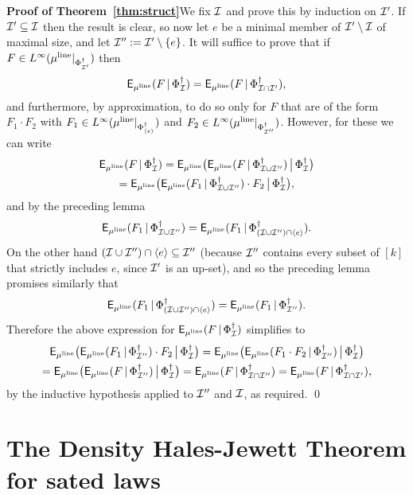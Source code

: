 \documentclass[11pt]{article}
\begin{document}
\textbf{Proof of Theorem~\ref{thm:struct}}\quad We fix $\mathcal{I}$ and
prove this by induction on $\mathcal{I}'$. If $\mathcal{I}' \subseteq \mathcal{I}$ then the
result is clear, so now let $e$ be a minimal member of
$\mathcal{I}'\setminus\mathcal{I}$ of maximal size, and let $\mathcal{I}'' :=
\mathcal{I}'\setminus\{e\}$.  It will suffice to prove that if $F \in
L^\infty(\mu^{\mathrm{line}}|_{\Phi^\dag_{\mathcal{I}'}})$ then
\[\mathsf{E}_{\mu^{\mathrm{line}}}(F\,|\,\Phi^\dag_{\mathcal{I}}) = \mathsf{E}_{\mu^{\mathrm{line}}}(F\,|\,\Phi^\dag_{\mathcal{I}\cap\mathcal{I}'}),\]
and furthermore, by approximation, to do so only for $F$ that are of
the form $F_1\cdot F_2$ with $F_1 \in
L^\infty(\mu^{\mathrm{line}}|_{\Phi^\dag_{\langle e \rangle}})$ and $F_2 \in
L^\infty(\mu^{\mathrm{line}}|_{\Phi^\dag_{\mathcal{I}''}})$. However, for these we can
write \begin{multline*} \mathsf{E}_{\mu^{\mathrm{line}}}(F\,|\,\Phi^\dag_{\mathcal{I}}) =
\mathsf{E}_{\mu^{\mathrm{line}}}\big(\mathsf{E}_{\mu^{\mathrm{line}}}(F\,|\,\Phi^\dag_{\mathcal{I}\cup\mathcal{I}''})\,\big|\,\Phi^\dag_{\mathcal{I}}\big)\\
=
\mathsf{E}_{\mu^{\mathrm{line}}}\big(\mathsf{E}_{\mu^{\mathrm{line}}}(F_1\,|\,\Phi^\dag_{\mathcal{I}\cup\mathcal{I}''})\cdot
F_2\,\big|\,\Phi^\dag_{\mathcal{I}}\big),
\end{multline*}
and by the preceding lemma
\[\mathsf{E}_{\mu^{\mathrm{line}}}(F_1\,|\,\Phi^\dag_{\mathcal{I}\cup\mathcal{I}''})
= \mathsf{E}_{\mu^{\mathrm{line}}}(F_1\,|\,\Phi^\dag_{(\mathcal{I}\cup\mathcal{I}'')\cap\langle
e\rangle}).\] On the other hand $(\mathcal{I}\cup\mathcal{I}'')\cap\langle e\rangle
\subseteq \mathcal{I}''$ (because $\mathcal{I}''$ contains every subset of $[k]$ that
strictly includes $e$, since $\mathcal{I}'$ is an up-set), and so the
preceding lemma promises similarly that
\[\mathsf{E}_{\mu^{\mathrm{line}}}(F_1\,|\,\Phi^\dag_{(\mathcal{I}\cup\mathcal{I}'')\cap\langle
e\rangle}) = \mathsf{E}_{\mu^{\mathrm{line}}}(F_1\,|\,\Phi^\dag_{\mathcal{I}''}).\] Therefore
the above expression for $\mathsf{E}_{\mu^{\mathrm{line}}}(F\,|\,\Phi^\dag_{\mathcal{I}})$
simplifies to
\begin{multline*}
\mathsf{E}_{\mu^{\mathrm{line}}}\big(\mathsf{E}_{\mu^{\mathrm{line}}}(F_1\,|\,\Phi^\dag_{\mathcal{I}''})\cdot
F_2\,\big|\,\Phi^\dag_{\mathcal{I}}\big) =
\mathsf{E}_{\mu^{\mathrm{line}}}\big(\mathsf{E}_{\mu^{\mathrm{line}}}(F_1\cdot
F_2\,|\,\Phi^\dag_{\mathcal{I}''})\,\big|\,\Phi^\dag_{\mathcal{I}}\big)\\
=
\mathsf{E}_{\mu^{\mathrm{line}}}\big(\mathsf{E}_{\mu^{\mathrm{line}}}(F\,|\,\Phi^\dag_{\mathcal{I}''})\,\big|\,\Phi^\dag_{\mathcal{I}}\big)
= \mathsf{E}_{\mu^{\mathrm{line}}}(F\,|\,\Phi^\dag_{\mathcal{I}\cap \mathcal{I}''}) =
\mathsf{E}_{\mu^{\mathrm{line}}}(F\,|\,\Phi^\dag_{\mathcal{I}\cap\mathcal{I}'}),
\end{multline*}
by the inductive hypothesis applied to $\mathcal{I}''$ and $\mathcal{I}$, as required.
\qed

\section{The Density Hales-Jewett Theorem for sated
laws}\label{sec:final}
\end{document}
